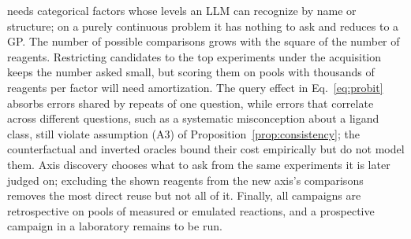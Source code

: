 \ours{} needs categorical factors whose levels an LLM can recognize by name or structure; on a purely continuous problem it has nothing to ask and reduces to a GP. The number of possible comparisons grows with the square of the number of reagents. Restricting candidates to the top experiments under the acquisition keeps the number asked small, but scoring them on pools with thousands of reagents per factor will need amortization. The query effect in Eq.~\eqref{eq:probit} absorbs errors shared by repeats of one question, while errors that correlate across different questions, such as a systematic misconception about a ligand class, still violate assumption (A3) of Proposition~\ref{prop:consistency}; the counterfactual and inverted oracles bound their cost empirically but do not model them. Axis discovery chooses what to ask from the same experiments it is later judged on; excluding the shown reagents from the new axis's comparisons removes the most direct reuse but not all of it. Finally, all campaigns are retrospective on pools of measured or emulated reactions, and a prospective campaign in a laboratory remains to be run.
